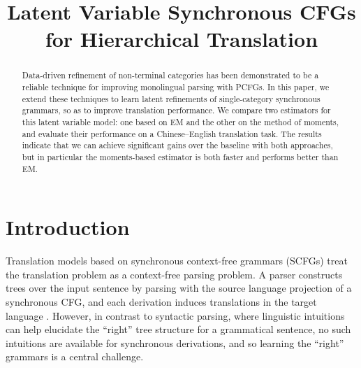 \documentclass[11pt]{article}
\title{Latent Variable Synchronous CFGs for Hierarchical Translation}
\date{}
\begin{document}
\maketitle
\begin{abstract}
Data-driven refinement of non-terminal categories has been demonstrated to be a reliable technique for improving monolingual parsing with PCFGs. 
In this paper, we extend these techniques to learn latent refinements of single-category synchronous grammars, so as to improve translation performance. 
We compare two estimators for this latent variable model: one based on EM and the other on the method of moments, and evaluate their performance on a Chinese--English translation task.
The results indicate that we can achieve significant gains over the baseline with both approaches, but in particular the moments-based estimator is both faster and performs better than EM.  
\end{abstract}

\section{Introduction}
Translation models based on synchronous context-free grammars (SCFGs) treat the translation problem as a context-free parsing problem. 
A parser constructs trees over the input sentence by parsing with the source language projection of a synchronous CFG, and each derivation induces translations in the target language \cite{Chiang2007}. 
However, in contrast to syntactic parsing, where linguistic intuitions can help elucidate the ``right'' tree structure for a grammatical sentence, no such intuitions are available for synchronous derivations, and so learning the ``right'' grammars is a central challenge.
\end{document}
